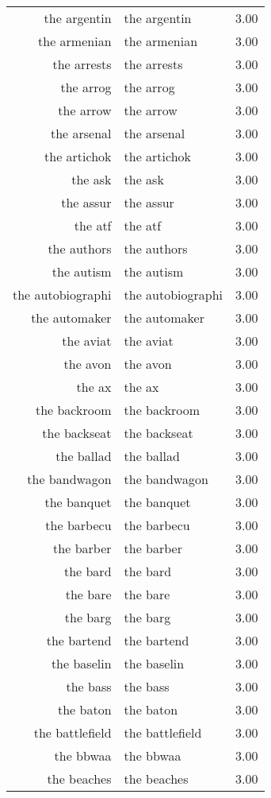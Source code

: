\begin{table}[ht]
\begin{tabular}{rlr}
  the argentin & the argentin & 3.00 \\ 
  the armenian & the armenian & 3.00 \\ 
  the arrests & the arrests & 3.00 \\ 
  the arrog & the arrog & 3.00 \\ 
  the arrow & the arrow & 3.00 \\ 
  the arsenal & the arsenal & 3.00 \\ 
  the artichok & the artichok & 3.00 \\ 
  the ask & the ask & 3.00 \\ 
  the assur & the assur & 3.00 \\ 
  the atf & the atf & 3.00 \\ 
  the authors & the authors & 3.00 \\ 
  the autism & the autism & 3.00 \\ 
  the autobiographi & the autobiographi & 3.00 \\ 
  the automaker & the automaker & 3.00 \\ 
  the aviat & the aviat & 3.00 \\ 
  the avon & the avon & 3.00 \\ 
  the ax & the ax & 3.00 \\ 
  the backroom & the backroom & 3.00 \\ 
  the backseat & the backseat & 3.00 \\ 
  the ballad & the ballad & 3.00 \\ 
  the bandwagon & the bandwagon & 3.00 \\ 
  the banquet & the banquet & 3.00 \\ 
  the barbecu & the barbecu & 3.00 \\ 
  the barber & the barber & 3.00 \\ 
  the bard & the bard & 3.00 \\ 
  the bare & the bare & 3.00 \\ 
  the barg & the barg & 3.00 \\ 
  the bartend & the bartend & 3.00 \\ 
  the baselin & the baselin & 3.00 \\ 
  the bass & the bass & 3.00 \\ 
  the baton & the baton & 3.00 \\ 
  the battlefield & the battlefield & 3.00 \\ 
  the bbwaa & the bbwaa & 3.00 \\ 
  the beaches & the beaches & 3.00 \\ 

\end{tabular}
\end{table}
